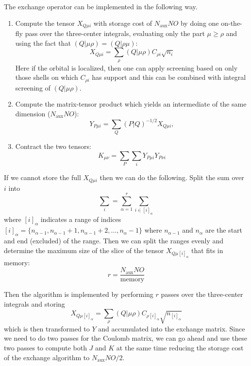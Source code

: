 \documentclass[aip,preprint]{revtex4-1}
\begin{document}
The exchange operator can be implemented in the following way.
\begin{enumerate}
    \item Compute the tensor $X_{Q \mu i}$ with storage cost of $N_\mathrm{aux} N O$ by doing one on-the-fly pass over the three-center integrals, evaluating only the part $\mu \geq \rho$ and using the fact that $(Q | \mu \rho)=(Q | \rho \mu)$:
\begin{equation}
X_{Q \mu i} = \sum_{\rho} (Q | \mu \rho) C_{\rho i} \sqrt{n_i}
\end{equation}
Here if the orbital is localized, then one can apply screening based on only those shells on which $C_{\rho i}$ has support and this can be combined with integral screening of $(Q | \mu \rho)$.

    \item Compute the matrix-tensor product which yields an intermediate of the same dimension ($N_\mathrm{aux} N O$):
\begin{equation}
Y_{P \mu i} = \sum_{Q} (P|Q)^{-1/2} X_{Q \mu i},
\end{equation}
    \item Contract the two tensors:
\begin{equation}
K_{\mu \nu} = \sum_{P} \sum_{i} Y_{P \mu i} Y_{P \nu i}
\end{equation}
\end{enumerate}
If we cannot store the full $X_{Q \mu i}$ then we can do the following. Split the sum over $i$ into
\begin{equation}
\sum_i = \sum_{\alpha=1}^{r} \sum_{i \in [i]_\alpha}
\end{equation}
where $[i]_\alpha$ indicates a range of indices $[i]_\alpha = \{n_{\alpha-1}, n_{\alpha-1} + 1, n_{\alpha-1} + 2, \ldots, n_{\alpha} - 1\}$ where $n_{\alpha-1}$ and $n_{\alpha}$ are the start and end (excluded) of the range.
Then we can split the ranges evenly and determine the maximum size of the slice of the tensor $X_{Q\mu [i]_\alpha}$ that fits in memory:
\begin{equation}
r = \frac{N_\mathrm{aux} N O}{\textrm{memory}}
\end{equation}

Then the algorithm is implemented by performing $r$ passes over the three-center integrals and storing
\begin{equation}
X_{Q \mu [i]_\alpha} = \sum_{\rho} (Q | \mu \rho) C_{\rho [i]_\alpha}\sqrt{n_{[i]_\alpha}}
\end{equation}
which is then transformed to $Y$ and accumulated into the exchange matrix.
Since we need to do two passes for the Coulomb matrix, we can go ahead and use these two passes to compute both $J$ and $K$ at the same time reducing the storage cost of the exchange algorithm to $N_\mathrm{aux} N O/2$.
\end{document}
